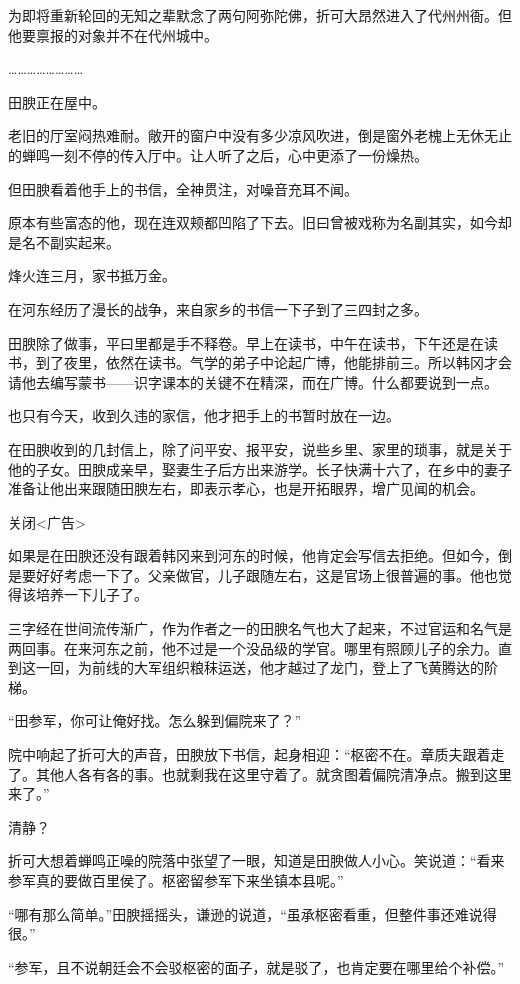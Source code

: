 为即将重新轮回的无知之辈默念了两句阿弥陀佛，折可大昂然进入了代州州衙。但他要禀报的对象并不在代州城中。

……………………

田腴正在屋中。

老旧的厅室闷热难耐。敞开的窗户中没有多少凉风吹进，倒是窗外老槐上无休无止的蝉鸣一刻不停的传入厅中。让人听了之后，心中更添了一份燥热。

但田腴看着他手上的书信，全神贯注，对噪音充耳不闻。

原本有些富态的他，现在连双颊都凹陷了下去。旧曰曾被戏称为名副其实，如今却是名不副实起来。

烽火连三月，家书抵万金。

在河东经历了漫长的战争，来自家乡的书信一下子到了三四封之多。

田腴除了做事，平曰里都是手不释卷。早上在读书，中午在读书，下午还是在读书，到了夜里，依然在读书。气学的弟子中论起广博，他能排前三。所以韩冈才会请他去编写蒙书——识字课本的关键不在精深，而在广博。什么都要说到一点。

也只有今天，收到久违的家信，他才把手上的书暂时放在一边。

在田腴收到的几封信上，除了问平安、报平安，说些乡里、家里的琐事，就是关于他的子女。田腴成亲早，娶妻生子后方出来游学。长子快满十六了，在乡中的妻子准备让他出来跟随田腴左右，即表示孝心，也是开拓眼界，增广见闻的机会。

关闭<广告>

如果是在田腴还没有跟着韩冈来到河东的时候，他肯定会写信去拒绝。但如今，倒是要好好考虑一下了。父亲做官，儿子跟随左右，这是官场上很普遍的事。他也觉得该培养一下儿子了。

三字经在世间流传渐广，作为作者之一的田腴名气也大了起来，不过官运和名气是两回事。在来河东之前，他不过是一个没品级的学官。哪里有照顾儿子的余力。直到这一回，为前线的大军组织粮秣运送，他才越过了龙门，登上了飞黄腾达的阶梯。

“田参军，你可让俺好找。怎么躲到偏院来了？”

院中响起了折可大的声音，田腴放下书信，起身相迎：“枢密不在。章质夫跟着走了。其他人各有各的事。也就剩我在这里守着了。就贪图着偏院清净点。搬到这里来了。”

清静？

折可大想着蝉鸣正噪的院落中张望了一眼，知道是田腴做人小心。笑说道：“看来参军真的要做百里侯了。枢密留参军下来坐镇本县呢。”

“哪有那么简单。”田腴摇摇头，谦逊的说道，“虽承枢密看重，但整件事还难说得很。”

“参军，且不说朝廷会不会驳枢密的面子，就是驳了，也肯定要在哪里给个补偿。”

